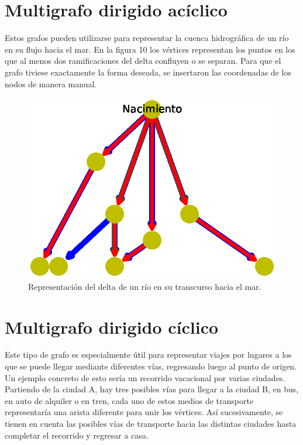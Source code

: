 \documentclass{article}
\begin{document}



\section{Multigrafo dirigido acíclico}

Estos grafos pueden utilizarse para representar la cuenca hidrográfica de un río en su flujo hacia el mar. En la figura 10 los vértices representan los puntos en los que al menos dos ramificaciones del delta confluyen o se separan. Para que el grafo tiviese exactamente la forma deseada, se insertaron las coordenadas de los nodos de manera manual.

\begin{figure}
  \includegraphics[width=.8\columnwidth]{fig10.eps}
  \caption{Representación del delta de un río en su transcurso hacia el mar.}
  \label{Figura 10}
\end{figure}




\section{Multigrafo dirigido cíclico}

Este tipo de grafo es especialmente útil para representar viajes por lugares a los que se puede llegar mediante diferentes vías, regresando luego al punto de origen. Un ejemplo concreto de esto sería un recorrido vacacional por varias ciudades. Partiendo de la ciudad A, hay tres posibles vías  para llegar a la ciudad B, en bus, en auto de alquiler o en tren, cada uno de estos medios de transporte representaría una arista diferente para unir los vértices. Así sucesivamente, se tienen en cuenta las posibles vías de transporte hacia las distintas ciudades hasta completar el recorrido y regresar a casa. 
\end{document}
